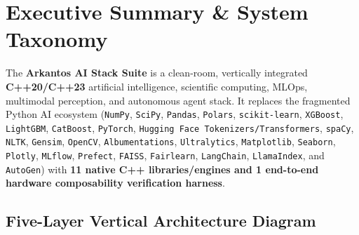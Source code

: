\documentclass[11pt,a4paper]{article}
\begin{document}
\tableofcontents
\newpage

\section{Executive Summary \& System Taxonomy}

The \textbf{Arkantos AI Stack Suite} is a clean-room, vertically integrated \textbf{C++20/C++23} artificial intelligence, scientific computing, MLOps, multimodal perception, and autonomous agent stack. It replaces the fragmented Python AI ecosystem (\texttt{NumPy}, \texttt{SciPy}, \texttt{Pandas}, \texttt{Polars}, \texttt{scikit-learn}, \texttt{XGBoost}, \texttt{LightGBM}, \texttt{CatBoost}, \texttt{PyTorch}, \texttt{Hugging Face Tokenizers/Transformers}, \texttt{spaCy}, \texttt{NLTK}, \texttt{Gensim}, \texttt{OpenCV}, \texttt{Albumentations}, \texttt{Ultralytics}, \texttt{Matplotlib}, \texttt{Seaborn}, \texttt{Plotly}, \texttt{MLflow}, \texttt{Prefect}, \texttt{FAISS}, \texttt{Fairlearn}, \texttt{LangChain}, \texttt{LlamaIndex}, and \texttt{AutoGen}) with \textbf{11 native C++ libraries/engines and 1 end-to-end hardware composability verification harness}.

\subsection{Five-Layer Vertical Architecture Diagram}
\end{document}
